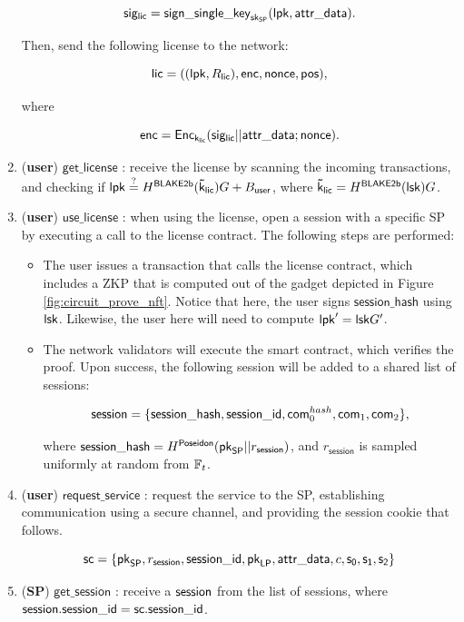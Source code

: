 \begin{enumerate}
		$$\mathsf{sig_{lic}} = \mathsf{sign\_single\_key}_{\mathsf{sk}_{\mathsf{SP}}}(\mathsf{lpk}, \mathsf{attr\_data}).$$

	Then, send the following license to the network:

		$$\mathsf{lic} = ((\mathsf{lpk}, R_{\mathsf{lic}}), \mathsf{enc}, \mathsf{nonce}, \mathsf{pos}),$$

	where 

		$$\mathsf{enc} = \mathsf{Enc}_{\mathsf{k_{lic}}} (\mathsf{sig_{lic}} || \mathsf{attr\_data}; \mathsf{nonce}).$$

	\item (\textbf{user}) $\mathsf{get\_license}$ : receive the license by scanning the incoming transactions, and checking if $\mathsf{lpk} \stackrel{?}{=} H^\mathsf{BLAKE2b}(\mathsf{\tilde{k}_{lic}}) G + B_{\mathsf{user}}$, where $\mathsf{\tilde{k}_{lic}} = H^\mathsf{BLAKE2b}(\mathsf{lsk})G$.

	\item (\textbf{user}) $\mathsf{use\_license}$ : when using the license, open a session with a specific SP by executing a call to the license contract. The following steps are performed:

	\begin{itemize}
		\item The user issues a transaction that calls the license contract, which includes a ZKP that is computed out of the gadget depicted in Figure \ref{fig:circuit_prove_nft}. Notice that here, the user signs $\mathsf{session\_hash}$ using $\mathsf{lsk}$. Likewise, the user here will need to compute $\mathsf{lpk}' = \mathsf{lsk} G'$.
		\item The network validators will execute the smart contract, which verifies the proof. Upon success, the following session will be added to a shared list of sessions:

			$$\mathsf{session} = \{\mathsf{session\_hash}, \mathsf{session\_id}, \mathsf{com}_0^{hash}, \mathsf{com}_1, \mathsf{com}_2\},$$

		where $\mathsf{session\_hash} = H^\mathsf{Poseidon}(\mathsf{pk}_{\mathsf{SP}} || r_\mathsf{session})$, and $r_\mathsf{session}$ is sampled uniformly at random from $\mathbb{F}_t$.


	\end{itemize}

	\item (\textbf{user}) $\mathsf{request\_service}$ : request the service to the SP, establishing communication using a secure channel, and providing the session cookie that follows.

		$$\mathsf{sc} = \{\mathsf{pk}_{\mathsf{SP}}, r_\mathsf{session}, \mathsf{session\_id}, \mathsf{pk}_{\mathsf{LP}}, \mathsf{attr\_data}, c, \mathsf{s_0}, \mathsf{s_1}, \mathsf{s_2}\}$$

	\item (\textbf{SP}) $\mathsf{get\_session}$ : receive a $\mathsf{session}$ from the list of sessions, where $\mathsf{session}.\mathsf{session\_id} = \mathsf{sc}.\mathsf{session\_id}$.


\end{enumerate}
